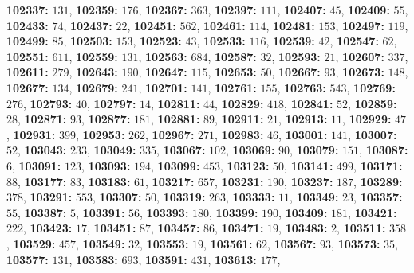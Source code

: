 \textsf{\bfseries 102337:} $131$, \textsf{\bfseries 102359:} $176$, \textsf{\bfseries 102367:} $363$, \textsf{\bfseries 102397:} $111$, \textsf{\bfseries 102407:} $45$, \textsf{\bfseries 102409:} $55$, \textsf{\bfseries 102433:} $74$, \textsf{\bfseries 102437:} $22$, \textsf{\bfseries 102451:} $562$, \textsf{\bfseries 102461:} $114$, \textsf{\bfseries 102481:} $153$, \textsf{\bfseries 102497:} $119$, \textsf{\bfseries 102499:} $85$, \textsf{\bfseries 102503:} $153$, \textsf{\bfseries 102523:} $43$, \textsf{\bfseries 102533:} $116$, \textsf{\bfseries 102539:} $42$, \textsf{\bfseries 102547:} $62$, \textsf{\bfseries 102551:} $611$, \textsf{\bfseries 102559:} $131$, \textsf{\bfseries 102563:} $684$, \textsf{\bfseries 102587:} $32$, \textsf{\bfseries 102593:} $21$, \textsf{\bfseries 102607:} $337$, \textsf{\bfseries 102611:} $279$, \textsf{\bfseries 102643:} $190$, \textsf{\bfseries 102647:} $115$, \textsf{\bfseries 102653:} $50$, \textsf{\bfseries 102667:} $93$, \textsf{\bfseries 102673:} $148$, \textsf{\bfseries 102677:} $134$, \textsf{\bfseries 102679:} $241$, \textsf{\bfseries 102701:} $141$, \textsf{\bfseries 102761:} $155$, \textsf{\bfseries 102763:} $543$, \textsf{\bfseries 102769:} $276$, \textsf{\bfseries 102793:} $40$, \textsf{\bfseries 102797:} $14$, \textsf{\bfseries 102811:} $44$, \textsf{\bfseries 102829:} $418$, \textsf{\bfseries 102841:} $52$, \textsf{\bfseries 102859:} $28$, \textsf{\bfseries 102871:} $93$, \textsf{\bfseries 102877:} $181$, \textsf{\bfseries 102881:} $89$, \textsf{\bfseries 102911:} $21$, \textsf{\bfseries 102913:} $11$, \textsf{\bfseries 102929:} $47$, \textsf{\bfseries 102931:} $399$, \textsf{\bfseries 102953:} $262$, \textsf{\bfseries 102967:} $271$, \textsf{\bfseries 102983:} $46$, \textsf{\bfseries 103001:} $141$, \textsf{\bfseries 103007:} $52$, \textsf{\bfseries 103043:} $233$, \textsf{\bfseries 103049:} $335$, \textsf{\bfseries 103067:} $102$, \textsf{\bfseries 103069:} $90$, \textsf{\bfseries 103079:} $151$, \textsf{\bfseries 103087:} $6$, \textsf{\bfseries 103091:} $123$, \textsf{\bfseries 103093:} $194$, \textsf{\bfseries 103099:} $453$, \textsf{\bfseries 103123:} $50$, \textsf{\bfseries 103141:} $499$, \textsf{\bfseries 103171:} $88$, \textsf{\bfseries 103177:} $83$, \textsf{\bfseries 103183:} $61$, \textsf{\bfseries 103217:} $657$, \textsf{\bfseries 103231:} $190$, \textsf{\bfseries 103237:} $187$, \textsf{\bfseries 103289:} $378$, \textsf{\bfseries 103291:} $553$, \textsf{\bfseries 103307:} $50$, \textsf{\bfseries 103319:} $263$, \textsf{\bfseries 103333:} $11$, \textsf{\bfseries 103349:} $23$, \textsf{\bfseries 103357:} $55$, \textsf{\bfseries 103387:} $5$, \textsf{\bfseries 103391:} $56$, \textsf{\bfseries 103393:} $180$, \textsf{\bfseries 103399:} $190$, \textsf{\bfseries 103409:} $181$, \textsf{\bfseries 103421:} $222$, \textsf{\bfseries 103423:} $17$, \textsf{\bfseries 103451:} $87$, \textsf{\bfseries 103457:} $86$, \textsf{\bfseries 103471:} $19$, \textsf{\bfseries 103483:} $2$, \textsf{\bfseries 103511:} $358$, \textsf{\bfseries 103529:} $457$, \textsf{\bfseries 103549:} $32$, \textsf{\bfseries 103553:} $19$, \textsf{\bfseries 103561:} $62$, \textsf{\bfseries 103567:} $93$, \textsf{\bfseries 103573:} $35$, \textsf{\bfseries 103577:} $131$, \textsf{\bfseries 103583:} $693$, \textsf{\bfseries 103591:} $431$, \textsf{\bfseries 103613:} $177$, 
